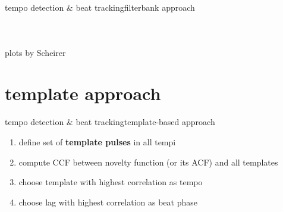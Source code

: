 \begin{frame}{tempo detection \& beat tracking}{filterbank approach}
\begin{columns}[T]
{\begin{figure}
                \end{figure}
                }
            \end{columns}
            plots by Scheirer
        \end{frame}

    \section{template approach}
        \begin{frame}{tempo detection \& beat tracking}{template-based approach}
            \begin{enumerate}
                \item	define set of \textbf{template pulses} in all tempi
                \smallskip
                \item<1->	compute CCF between novelty function (or its ACF) and all templates
                \smallskip
                \item<1->	choose template with highest correlation as tempo
                \smallskip
                \item<1->	choose lag with highest correlation as beat phase
            \end{enumerate}
        \end{frame}

